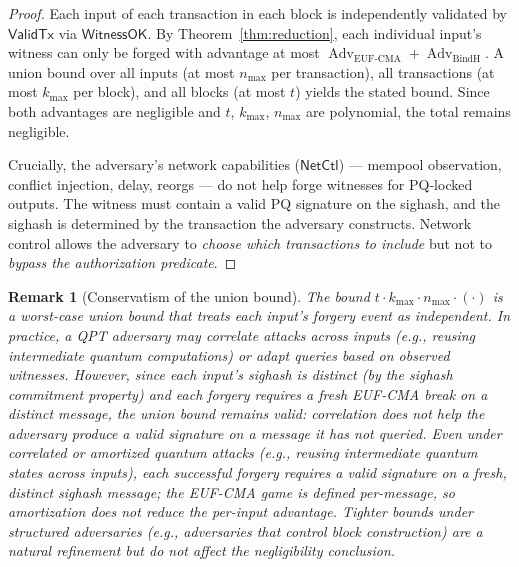 \documentclass[11pt]{article}
\newtheorem{remark}{Remark}
\newcommand{\Adv}{\operatorname{Adv}}
\newcommand{\ValidTx}{\mathsf{ValidTx}}
\begin{document}
\begin{proof}
Each input of each transaction in each block is independently validated by $\ValidTx$ via $\textsf{WitnessOK}$.
By Theorem~\ref{thm:reduction}, each individual input's witness can only be forged with advantage at most $\Adv_{\mathrm{EUF\mbox{-}CMA}} + \Adv_{\mathrm{BindH}}$.
A union bound over all inputs (at most $n_{\max}$ per transaction), all transactions (at most $k_{\max}$ per block), and all blocks (at most $t$) yields the stated bound.
Since both advantages are negligible and $t$, $k_{\max}$, $n_{\max}$ are polynomial, the total remains negligible.

Crucially, the adversary's network capabilities ($\mathsf{NetCtl}$) --- mempool observation, conflict injection, delay, reorgs --- do not help forge witnesses for PQ-locked outputs.
The witness must contain a valid PQ signature on the sighash, and the sighash is determined by the transaction the adversary constructs.
Network control allows the adversary to \emph{choose which transactions to include} but not to \emph{bypass the authorization predicate}.
\end{proof}

\begin{remark}[Conservatism of the union bound]
The bound $t\cdot k_{\max}\cdot n_{\max}\cdot(\cdot)$ is a worst-case union bound that treats each input's forgery event as independent.
In practice, a QPT adversary may correlate attacks across inputs (e.g., reusing intermediate quantum computations) or adapt queries based on observed witnesses.
However, since each input's sighash is distinct (by the sighash commitment property) and each forgery requires a fresh EUF-CMA break on a distinct message, the union bound remains valid: correlation does not help the adversary produce a valid signature on a message it has not queried.
Even under correlated or amortized quantum attacks (e.g., reusing intermediate quantum states across inputs), each successful forgery requires a valid signature on a fresh, distinct sighash message; the EUF-CMA game is defined per-message, so amortization does not reduce the per-input advantage.
Tighter bounds under structured adversaries (e.g., adversaries that control block construction) are a natural refinement but do not affect the negligibility conclusion.
\end{remark}
\end{document}
